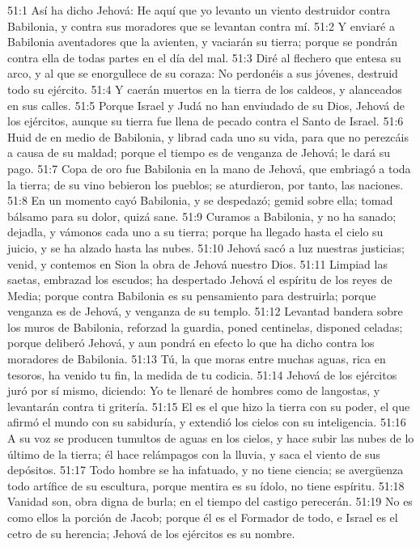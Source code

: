 51:1 Así ha dicho Jehová: He aquí que yo levanto un viento destruidor contra Babilonia, y contra sus moradores que se levantan contra mí. 
51:2 Y enviaré a Babilonia aventadores que la avienten, y vaciarán su tierra; porque se pondrán contra ella de todas partes en el día del mal. 
51:3 Diré al flechero que entesa su arco, y al que se enorgullece de su coraza: No perdonéis a sus jóvenes, destruid todo su ejército. 
51:4 Y caerán muertos en la tierra de los caldeos, y alanceados en sus calles. 
51:5 Porque Israel y Judá no han enviudado de su Dios, Jehová de los ejércitos, aunque su tierra fue llena de pecado contra el Santo de Israel. 
51:6 Huid de en medio de Babilonia, y librad cada uno su vida, para que no perezcáis a causa de su maldad; porque el tiempo es de venganza de Jehová; le dará su pago. 
51:7 Copa de oro fue Babilonia en la mano de Jehová, que embriagó a toda la tierra; de su vino bebieron los pueblos; se aturdieron, por tanto, las naciones. 
51:8 En un momento cayó Babilonia, y se despedazó; gemid sobre ella; tomad bálsamo para su dolor, quizá sane. 
51:9 Curamos a Babilonia, y no ha sanado; dejadla, y vámonos cada uno a su tierra; porque ha llegado hasta el cielo su juicio, y se ha alzado hasta las nubes. 
51:10 Jehová sacó a luz nuestras justicias; venid, y contemos en Sion la obra de Jehová nuestro Dios. 
51:11 Limpiad las saetas, embrazad los escudos; ha despertado Jehová el espíritu de los reyes de Media; porque contra Babilonia es su pensamiento para destruirla; porque venganza es de Jehová, y venganza de su templo. 
51:12 Levantad bandera sobre los muros de Babilonia, reforzad la guardia, poned centinelas, disponed celadas; porque deliberó Jehová, y aun pondrá en efecto lo que ha dicho contra los moradores de Babilonia. 
51:13 Tú, la que moras entre muchas aguas,  rica en tesoros, ha venido tu fin, la medida de tu codicia. 
51:14 Jehová de los ejércitos juró por sí mismo, diciendo: Yo te llenaré de hombres como de langostas, y levantarán contra ti gritería. 
51:15 El es el que hizo la tierra con su poder, el que afirmó el mundo con su sabiduría, y extendió los cielos con su inteligencia. 
51:16 A su voz se producen tumultos de aguas en los cielos, y hace subir las nubes de lo último de la tierra; él hace relámpagos con la lluvia, y saca el viento de sus depósitos. 
51:17 Todo hombre se ha infatuado, y no tiene ciencia; se avergüenza todo artífice de su escultura, porque mentira es su ídolo, no tiene espíritu. 
51:18 Vanidad son, obra digna de burla; en el tiempo del castigo perecerán. 
51:19 No es como ellos la porción de Jacob; porque él es el Formador de todo, e Israel es el cetro de su herencia; Jehová de los ejércitos es su nombre. 
